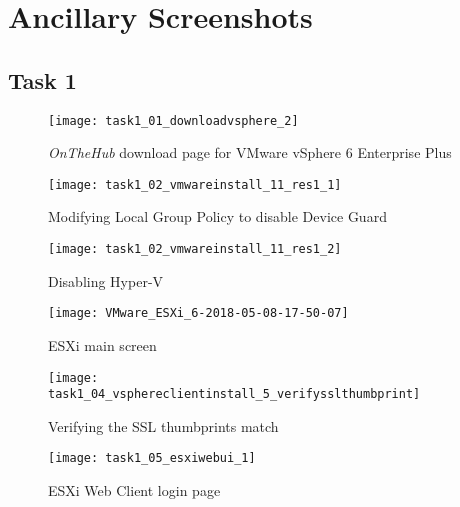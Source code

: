 \section{Ancillary Screenshots}
\label{app:ancillaryscreenshots}

\subsection{Task 1}

\begin{figure}[H]
  \centering
  \captionsetup{skip=2pt}
  \texttt{[image: task1\_01\_downloadvsphere\_2]}
  \caption{\textit{OnTheHub\textsuperscript{\textregistered}} download page for VMware vSphere 6 Enterprise Plus}
  \label{fig:task1:01_downloadvsphere}
\end{figure}

\begin{figure}[H]
  \centering
  \captionsetup{skip=2pt}
  \texttt{[image: task1\_02\_vmwareinstall\_11\_res1\_1]}
  \caption{Modifying Local Group Policy to disable Device Guard}
  \label{fig:task1:02_vmware_11_res1}
\end{figure}

\begin{figure}[H]
  \centering
  \captionsetup{skip=2pt}
  \texttt{[image: task1\_02\_vmwareinstall\_11\_res1\_2]}
  \caption{Disabling Hyper-V}
  \label{fig:task1:02_vmware_11_res2}
\end{figure}

\begin{figure}[H]
  \centering
  \captionsetup{skip=2pt}
  \texttt{[image: VMware\_ESXi\_6-2018-05-08-17-50-07]}
  \caption{ESXi main screen}
  \label{fig:task1:esxiinstall_up}
\end{figure}

\begin{figure}[H]
  \centering
  \captionsetup{skip=2pt}
  \texttt{[image: task1\_04\_vsphereclientinstall\_5\_verifysslthumbprint]}
  \caption{Verifying the SSL thumbprints match}
  \label{fig:task1:vspheredesktopclient_03}
\end{figure}

\begin{figure}[H]
  \centering
  \captionsetup{skip=2pt}
  \texttt{[image: task1\_05\_esxiwebui\_1]}
  \caption{ESXi Web Client login page}
  \label{fig:task1:esxiwebui_01}
\end{figure}

